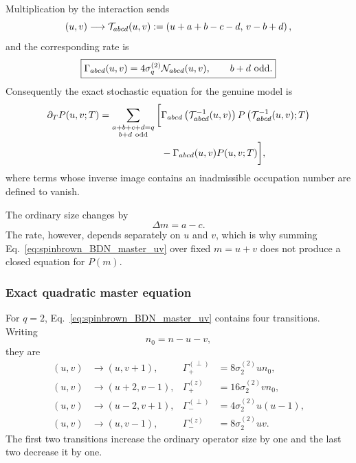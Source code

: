\documentclass{article}
\theoremstyle{definition}
\begin{document}
Multiplication by the interaction sends
\begin{equation}
    (u,v)
    \longrightarrow
    {\cal T}_{abcd}(u,v)
    :=
    \left(
       u+a+b-c-d,\,
       v-b+d
    \right),
    \label{eq:spinbrown_BDN_transition}
\end{equation}
and the corresponding rate is
\begin{equation}
    \boxed{
    \Gamma_{abcd}(u,v)
    =
    4\sigma_q^{(2)}
    {\cal N}_{abcd}(u,v),
    \qquad
    b+d\ {\rm odd}.
    }
    \label{eq:spinbrown_BDN_rate}
\end{equation}
Consequently the exact stochastic equation for the genuine model is
\begin{align}
    \partial_TP(u,v;T)
    =
    \sum_{\substack{a+b+c+d=q\\b+d\ {\rm odd}}}
    \bigg[
       &
       \Gamma_{abcd}
       \left(
          {\cal T}_{abcd}^{-1}(u,v)
       \right)
       P\left(
          {\cal T}_{abcd}^{-1}(u,v);T
       \right)
       \nonumber\\
       &-
       \Gamma_{abcd}(u,v)P(u,v;T)
    \bigg],
    \label{eq:spinbrown_BDN_master_uv}
\end{align}
where terms whose inverse image contains an inadmissible occupation number
are defined to vanish.

The ordinary size changes by
\begin{equation}
    \Delta m
    =
    a-c.
    \label{eq:spinbrown_BDN_delta_m}
\end{equation}
The rate, however, depends separately on $u$ and $v$, which is why summing
Eq.~\eqref{eq:spinbrown_BDN_master_uv} over fixed $m=u+v$ does not produce
a closed equation for $P(m)$.


\subsubsection{Exact quadratic master equation}

For $q=2$, Eq.~\eqref{eq:spinbrown_BDN_master_uv} contains four transitions.
Writing
\begin{equation}
    n_0=n-u-v,
\end{equation}
they are
\begin{align}
    (u,v)&\longrightarrow(u,v+1),
    &
    \Gamma_{+}^{(\perp)}
    &=
    8\sigma_2^{(2)}u n_0,
    \label{eq:spinbrown_BDN_q2_rate1}\\
    (u,v)&\longrightarrow(u+2,v-1),
    &
    \Gamma_{+}^{(z)}
    &=
    16\sigma_2^{(2)}v n_0,
    \label{eq:spinbrown_BDN_q2_rate2}\\
    (u,v)&\longrightarrow(u-2,v+1),
    &
    \Gamma_{-}^{(\perp)}
    &=
    4\sigma_2^{(2)}u(u-1),
    \label{eq:spinbrown_BDN_q2_rate3}\\
    (u,v)&\longrightarrow(u,v-1),
    &
    \Gamma_{-}^{(z)}
    &=
    8\sigma_2^{(2)}uv.
    \label{eq:spinbrown_BDN_q2_rate4}
\end{align}
The first two transitions increase the ordinary operator size by one and
the last two decrease it by one.
\end{document}
